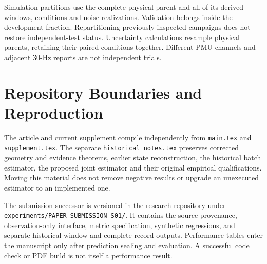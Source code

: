 Simulation partitions use the complete physical parent and all of its
derived windows, conditions and noise realizations. Validation belongs
inside the development fraction. Repartitioning previously inspected
campaigns does not restore independent-test status. Uncertainty calculations
resample physical parents, retaining their paired conditions together.
Different PMU channels and adjacent 30-Hz reports are not independent trials.

\section{Repository Boundaries and Reproduction}

The article and current supplement compile independently from
\texttt{main.tex} and \texttt{supplement.tex}. The separate
\texttt{historical\_notes.tex} preserves corrected geometry and evidence
theorems, earlier state reconstruction, the historical batch estimator,
the proposed joint estimator and their original empirical qualifications.
Moving this material does not remove negative results or upgrade an
unexecuted estimator to an implemented one.

The submission successor is versioned in the research repository under
\nolinkurl{experiments/PAPER_SUBMISSION_S01/}. It contains the source
provenance, observation-only interface, metric specification, synthetic
regressions, and separate historical-window and complete-record outputs.
Performance tables enter the manuscript only after prediction sealing and
evaluation. A successful code check or PDF build is not itself a performance
result.
